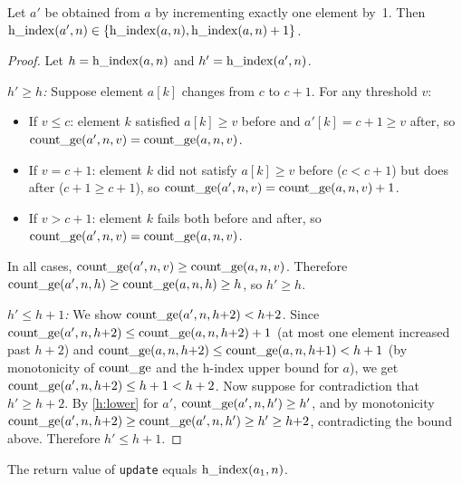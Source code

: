 \begin{lemma}\label{lem:hindex-incr}
Let $a'$ be obtained from $a$ by incrementing exactly one element by~1.
Then $\operatorname{h\_index}(a', n) \in \{\operatorname{h\_index}(a, n), \operatorname{h\_index}(a, n) + 1\}$.
\end{lemma}
\begin{proof}
Let $h = \operatorname{h\_index}(a, n)$ and $h' = \operatorname{h\_index}(a', n)$.

\emph{$h' \geq h$:}
Suppose element $a[k]$ changes from $c$ to $c+1$.
For any threshold $v$:
\begin{itemize}
  \item If $v \leq c$: element $k$ satisfied $a[k] \geq v$ before and $a'[k] = c+1 \geq v$ after,
    so $\operatorname{count\_ge}(a', n, v) = \operatorname{count\_ge}(a, n, v)$.
  \item If $v = c+1$: element $k$ did not satisfy $a[k] \geq v$ before ($c < c+1$) but does after
    ($c+1 \geq c+1$), so $\operatorname{count\_ge}(a', n, v) = \operatorname{count\_ge}(a, n, v) + 1$.
  \item If $v > c+1$: element $k$ fails both before and after, so $\operatorname{count\_ge}(a', n, v) = \operatorname{count\_ge}(a, n, v)$.
\end{itemize}
In all cases, $\operatorname{count\_ge}(a', n, v) \geq \operatorname{count\_ge}(a, n, v)$.
Therefore $\operatorname{count\_ge}(a', n, h) \geq \operatorname{count\_ge}(a, n, h) \geq h$, so $h' \geq h$.

\emph{$h' \leq h + 1$:} We show $\operatorname{count\_ge}(a', n, h{+}2) < h{+}2$.
Since $\operatorname{count\_ge}(a', n, h{+}2) \leq \operatorname{count\_ge}(a, n, h{+}2) + 1$ (at most one element increased
past $h{+}2$) and $\operatorname{count\_ge}(a, n, h{+}2) \leq \operatorname{count\_ge}(a, n, h{+}1) < h + 1$
(by monotonicity of $\operatorname{count\_ge}$ and the h-index upper bound for $a$), we get
$\operatorname{count\_ge}(a', n, h{+}2) \leq h + 1 < h + 2$.
Now suppose for contradiction that $h' \geq h+2$. By \ref{h:lower} for $a'$,
$\operatorname{count\_ge}(a', n, h') \geq h'$, and by monotonicity $\operatorname{count\_ge}(a', n, h{+}2) \geq
\operatorname{count\_ge}(a', n, h') \geq h' \geq h{+}2$, contradicting the bound above.
Therefore $h' \leq h + 1$.
\end{proof}

\begin{theorem}\label{thm:update-hindex}
The return value of \texttt{update} equals $\operatorname{h\_index}(a_1, n)$.
\end{theorem}

